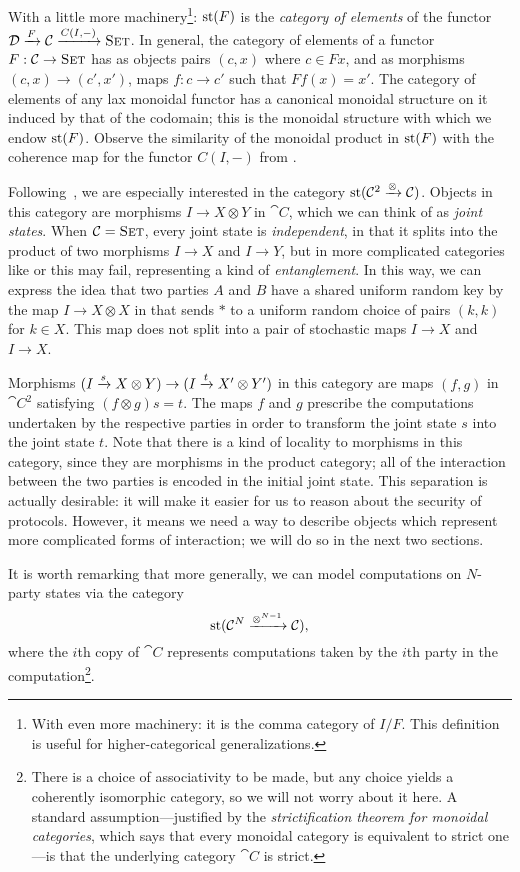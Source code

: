 With a little more machinery\footnote{With even more machinery: it is the comma
category of $I/F$. This definition is useful for higher-categorical
generalizations.}: $\operatorname*{st}(F)$ is the \emph{category of elements}
of the functor ${\mathcal{D}}\xrightarrow{F}{\mathcal{C}}\xrightarrow{C(I, -)}{\textsc{\text{Set}}}$. In general, the
category of elements of a functor $F: {\mathcal{C}}\to{\textsc{\text{Set}}}$ has as objects pairs
$(c, x)$ where $c\in Fx$, and as morphisms $(c, x)\to (c', x')$, maps $f: c\to
c'$ such that $Ff(x) = x'$. The category of elements of any lax monoidal functor
has a canonical monoidal structure on it induced by that of the codomain; this
is the monoidal structure with which we endow $\operatorname*{st}(F)$. Observe the
similarity of the monoidal product in $\operatorname*{st}(F)$ with the coherence map for the
functor $C(I, -)$ from . 

Following~\cite{broadbent-karvonen-2022}, we are especially interested in the category
$\operatorname*{st}({\mathcal{C}}^2\xrightarrow{\otimes}{\mathcal{C}})$. Objects in this category are morphisms
$I\to X\otimes Y$ in $\cat{C}$, which we can think of as \emph{joint states}.
When ${\mathcal{C}} = {\textsc{\text{Set}}}$, every joint state is \emph{independent}, in that it
splits into the product of two morphisms $I\to X$ and $I\to Y$, but in more
complicated categories like  or  this may fail, representing a
kind of \emph{entanglement}. In this way, we can express the idea that two
parties $A$ and $B$ have a shared uniform random key by the map $I\to X\otimes
X$ in  that sends $*$ to a uniform random choice of pairs $(k, k)$ for
$k\in X$. This map does not split into a pair of stochastic maps $I\to X$ and $I\to X$.

Morphisms $(I\xrightarrow{s} X\otimes Y)\to(I\xrightarrow{t}X'\otimes Y')$ in this category are
maps $(f,g)$ in $\cat{C}^2$ satisfying $(f\otimes g)s = t$. The maps $f$ and $g$
prescribe the computations undertaken by the respective parties in order to
transform the joint state $s$ into the joint state $t$. Note that there is a
kind of locality to morphisms in this category, since they are morphisms in the
product category; all of the interaction between the two parties is encoded in
the initial joint state. This separation is actually desirable: it will make it
easier for us to reason about the security of protocols. However, it means we
need a way to describe objects which represent more complicated forms of
interaction; we will do so in the next two sections.

It is worth remarking that more generally, we can model computations on
$N$-party states via the category
\[
  \operatorname*{st}({\mathcal{C}}^N\xrightarrow{\otimes^{N-1}}{\mathcal{C}}),
\] where the $i$th copy of $\cat{C}$ represents computations taken by the $i$th
party in the computation\footnote{There is a choice of associativity to be made, but any
choice yields a coherently isomorphic category, so we will not worry about it
here. A standard assumption---justified by the \emph{strictification theorem for
monoidal categories}, which says that every monoidal category is equivalent to
strict one---is that the underlying category $\cat{C}$ is strict.}.

